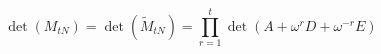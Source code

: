 \begin{equation}
\det(M_{tN}) = \det(\tilde{M}_{tN}) = \prod_{r=1}^{t} \det \left( A +  \omega^r D + \omega^{-r} E \right)
\end{equation}

